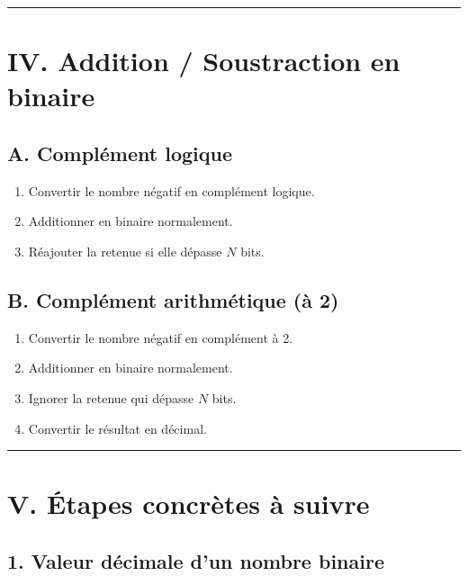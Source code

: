 \documentclass[a4paper,12pt]{article}
\begin{document}
  

\hrule
\section*{IV. Addition / Soustraction en binaire} 

  

\subsection*{A. Complément logique} 

\begin{enumerate} 

    \item Convertir le nombre négatif en complément logique. 

    \item Additionner en binaire normalement. 

    \item Réajouter la retenue si elle dépasse $N$ bits. 

\end{enumerate} 

  

\subsection*{B. Complément arithmétique (à 2)} 

\begin{enumerate} 

    \item Convertir le nombre négatif en complément à 2. 

    \item Additionner en binaire normalement. 

    \item Ignorer la retenue qui dépasse $N$ bits. 

    \item Convertir le résultat en décimal. 

\end{enumerate} 

  

\hrule
\section*{V. Étapes concrètes à suivre} 

  

\subsection*{1. Valeur décimale d’un nombre binaire} 
\end{document}
